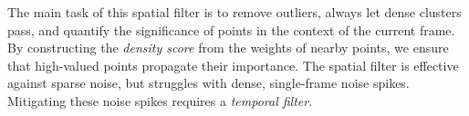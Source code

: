 


The main task of this spatial filter is to remove outliers, always let dense clusters pass, and quantify the significance of points in the context of the current frame.
By constructing the \textit{density score} from the weights of nearby points, we ensure that high-valued points propagate their importance.
The spatial filter is effective against sparse noise, but struggles with dense, single-frame noise spikes.
Mitigating these noise spikes requires a \textit{temporal filter}.






